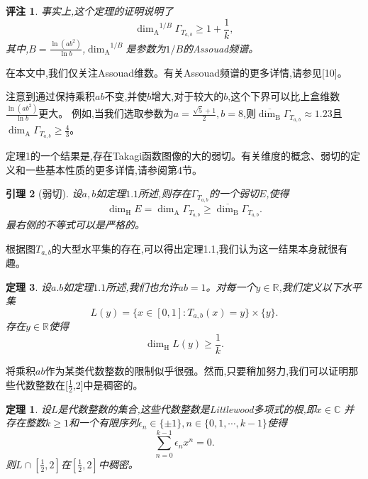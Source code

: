 \documentclass[12pt,a4paper]{article}
\newtheorem{theorem}{定理}[section]
\newtheorem{remark}[theorem]{评注}
\newtheorem{lemma}[theorem]{引理}
\newtheorem*{theoremno}{定理}
\newcommand{\Hdim}{\mathrm{\dim_H}}
\newcommand{\Adim}{\mathrm{\dim_A}}
\newcommand{\Bdim}{\mathrm{\dim_B}}
\begin{document}
      \begin{remark}
            事实上,这个定理的证明说明了
            $$
                  \Adim^{1/B}\Gamma_{T_{a,b}}\ge1+\frac{1}{k},
            $$
            其中,$B=\frac{\ln(ab^2)}{\ln b}$,$\Adim^{1/B}$是参数为$1/B$的Assouad频谱。
      \end{remark}

      在本文中,我们仅关注Assouad维数。有关Assouad频谱的更多详情,请参见[10]。

      注意到通过保持乘积$ab$不变,并使$b$增大,对于较大的$b$,这个下界可以比上盒维数$\frac{\ln(ab^2)}{\ln b}$更大。
      例如,当我们选取参数为$a=\frac{\sqrt{5}+1}{2},b=8$,则$\overline{\Bdim}\Gamma_{T_{a,b}}\approx1.23$且
      $\Adim\Gamma_{T_{a,b}}\ge\frac{4}{3}$。

      定理1的一个结果是,存在Takagi函数图像的大的弱切。有关维度的概念、弱切的定义和一些基本性质的更多详情,请参阅第4节。

      \begin{lemma}[弱切]
            设$a,b$如定理$1.1$所述,则存在$\Gamma_{T_{a,b}}$的一个弱切$E$,使得
            $$
                  \Hdim E=\Adim\Gamma_{T_{a,b}}\ge\overline{\Bdim}\Gamma_{T_{a,b}}.
            $$
            最右侧的不等式可以是严格的。
      \end{lemma}

      根据图$T_{a,b}$的大型水平集的存在,可以得出定理1.1,我们认为这一结果本身就很有趣。

      \begin{theorem}
            设$a.b$如定理$1.1$所述,我们也允许$ab=1$。对每一个$y\in\mathbb{R}$,我们定义以下水平集
            $$
                  L(y) = \{x\in[0,1]:T_{a,b}(x)=y\}\times\{y\}.
            $$
            存在$y\in\mathbb{R}$使得
            $$
                  \Hdim L(y)\ge\frac{1}{k}.
            $$
      \end{theorem}

      将乘积$ab$作为某类代数整数的限制似乎很强。然而,只要稍加努力,我们可以证明那些代数整数在[$\frac{1}{2}$,2]中是稠密的。

      \begin{theoremno}
            设$L$是代数整数的集合,这些代数整数是Littlewood多项式的根,即$x\in\mathbb{C}$
            并存在整数$k\ge1$和一个有限序列$\epsilon_n\in\{\pm1\},n\in\{0,1,\cdots,k-1\}$使得
            $$
                  \sum_{n=0}^{k-1}\epsilon_nx^n=0.
            $$
            则$L\cap[\frac{1}{2},2]$在$[\frac{1}{2},2]$中稠密。
      \end{theoremno}
\end{document}

